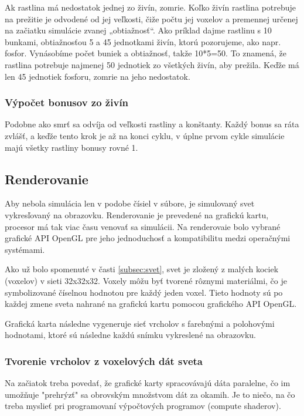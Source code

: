 \documentclass[12pt]{article}
\begin{document}
Ak rastlina má nedostatok jednej zo živín, zomrie. Koľko živín rastlina
potrebuje na prežitie je odvodené od jej veľkosti, čiže počtu jej voxelov
a premennej určenej na začiatku simulácie zvanej „obtiažnosť“. Ako príklad
dajme rastlinu s 10 bunkami, obtiažnosťou 5 a 45 jednotkami živín, ktorú
pozorujeme, ako napr. fosfor. Vynásobíme počet buniek a obtiažnosť, takže
10*5=50. To znamená, že rastlina potrebuje najmenej 50 jednotiek zo všetkých
živín, aby prežila. Keďže má len 45 jednotiek fosforu, zomrie na jeho
nedostatok.

\subsubsection{Výpočet bonusov zo živín}

Podobne ako smrť sa odvíja od veľkosti rastliny a konštanty. Každý bonus
sa ráta zvlášť, a keďže tento krok je až na konci cyklu, v úplne prvom cykle
simulácie majú všetky rastliny bonusy rovné 1.

\newpage
\subsection{Renderovanie}

Aby nebola simulácia len v podobe čísiel v súbore, je simulovaný svet
vykresľovaný na obrazovku. Renderovanie je prevedené na grafickú kartu,
procesor má tak viac času venovať sa simulácii. Na renderovaie bolo vybrané
grafické API OpenGL pre jeho jednoduchosť a kompatibilitu medzi operačnými
systémami.

Ako už bolo spomenuté v časti \ref{subsec:svet}, svet je zložený z malých
kociek (voxelov) v sieti 32x32x32. Voxely môžu byť tvorené rôznymi materiálmi,
čo je symbolizované číselnou hodnotou pre každý jeden voxel. Tieto
hodnoty sú po každej zmene sveta nahrané na grafickú kartu pomocou grafického
API OpenGL.

Grafická karta následne vygeneruje sieť vrcholov s farebnými a
polohovými hodnotami, ktoré sú následne každú snímku vykreslené na obrazovku.

\subsubsection{Tvorenie vrcholov z voxelových dát sveta}

Na začiatok treba povedať, že grafické karty spracovávajú dáta paralelne,
čo im umožňuje "prehrýzť" sa obrovským množstvom dát za okamih.
Je to niečo, na čo treba myslieť pri programovaní výpočtových programov
(compute shaderov).
\end{document}
